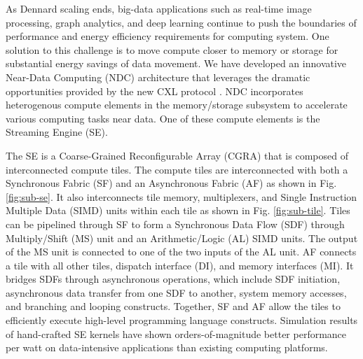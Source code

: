 As Dennard scaling ends, big-data applications such as real-time image processing, graph analytics, and deep learning continue to push the boundaries of performance and energy efficiency requirements for computing system. 
One solution to this challenge is to move compute closer to memory or storage for substantial energy savings of data movement. 
We have developed an innovative Near-Data Computing (NDC) architecture that leverages the dramatic opportunities provided by the new CXL protocol \cite{sharma2020compute}. 
NDC incorporates heterogenous compute elements in the memory/storage subsystem to accelerate various computing tasks near data. 
One of these compute elements is the Streaming Engine (SE).

The SE is a Coarse-Grained Reconfigurable Array (CGRA) that is composed of interconnected compute tiles.  
The compute tiles are interconnected with both a Synchronous Fabric (SF) and an Asynchronous Fabric (AF) as shown in Fig. \ref{fig:sub-se}.
It also interconnects tile memory, multiplexers, and Single Instruction Multiple Data (SIMD) units within each tile as shown in Fig. \ref{fig:sub-tile}. 
Tiles can be pipelined through SF to form a Synchronous Data Flow (SDF) through Multiply/Shift (MS) unit and an Arithmetic/Logic (AL) SIMD units. 
The output of the MS unit is connected to one of the two inputs of the AL unit.
AF connects a tile with all other tiles, dispatch interface (DI), and memory interfaces (MI).
It bridges SDFs through asynchronous operations, which include SDF initiation, asynchronous data transfer from one SDF to another, system memory accesses, and branching and looping constructs. 
Together, SF and AF allow the tiles to efficiently execute high-level programming language constructs.
Simulation results of hand-crafted SE kernels have shown orders-of-magnitude better performance per watt on data-intensive applications than existing computing platforms.

